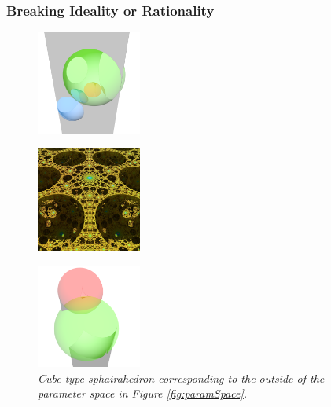 
\subsubsection{Breaking Ideality or Rationality}

\begin{figure}[h!tbp]
 \begin{minipage}[t]{0.5\textwidth}
  \begin{minipage}[t]{0.24\textwidth}
   \centering
   \includegraphics[width=1.35in, height=1.35in, keepaspectratio]{./img/application/sphairahedron/breakingIdealityOrRationality/outsidePrism.png}
   \label{fig:hole-sphairahedron}
  \end{minipage}
 \hspace*{\fill}
  \begin{minipage}[t]{0.24\textwidth}
   \centering
   \includegraphics[width=1.35in, height=1.35in, keepaspectratio]{./img/application/sphairahedron/breakingIdealityOrRationality/outsideLimit.jpg}
   \label{fig:intersect-overlap}
  \end{minipage}
  \hspace*{\fill}
  \caption{\textit{Cube-type sphairahedron corresponding to the outside of the parameter
  space in Figure \ref{fig:paramSpace}.}}
  \label{fig:self-intersect}
 \end{minipage}
 \begin{minipage}[t]{0.5\textwidth}
  \begin{minipage}[t]{0.24\textwidth}
   \centering
   \includegraphics[width=1.35in, height=1.35in, keepaspectratio]{./img/application/sphairahedron/breakingIdealityOrRationality/brokenCakePrism.png}

\end{minipage}
\end{minipage}
\end{figure}
